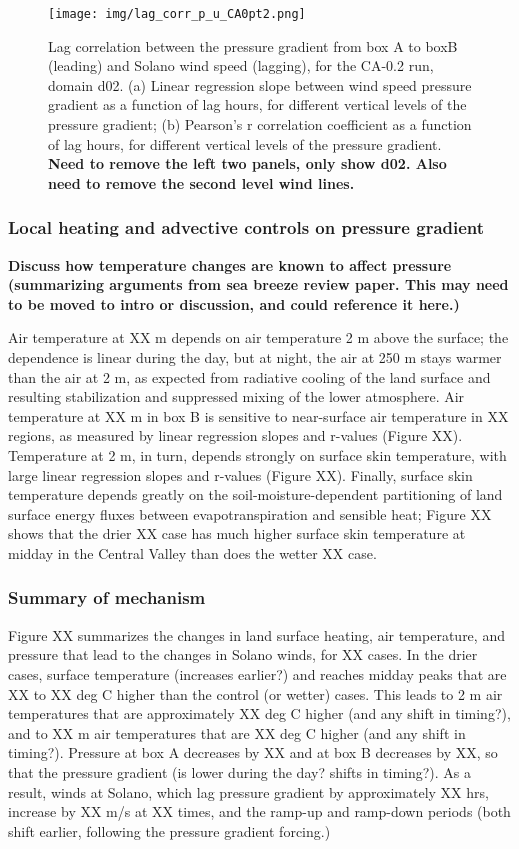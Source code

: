 \begin{figure}[here]
\texttt{[image: img/lag\_corr\_p\_u\_CA0pt2.png]}
\caption{Lag correlation between the pressure gradient from box A to boxB (leading) and Solano wind speed (lagging), for the CA-0.2 run, domain d02.  (a) Linear regression slope between wind speed pressure gradient as a function of lag hours, for different vertical levels of the pressure gradient; (b) Pearson's r correlation coefficient as a function of lag hours, for different vertical levels of the pressure gradient.  \textbf{Need to remove the left two panels, only show d02.  Also need to remove the second level wind lines.}}
\label{fig:windSol_lagcorrPgradU}
\end{figure}

\subsubsection{Local heating and advective controls on pressure gradient}

\textbf{Discuss how temperature changes are known to affect pressure (summarizing arguments from sea breeze review paper.  This may need to be moved to intro or discussion, and could reference it here.)}

Air temperature at XX m depends on air temperature 2 m above the surface; the dependence is linear during the day, but at night, the air at 250 m stays warmer than the air at 2 m, as expected from radiative cooling of the land surface and resulting stabilization and suppressed mixing of the lower atmosphere.  Air temperature at XX m in box B is sensitive to near-surface air temperature in XX regions, as measured by linear regression slopes and r-values (Figure XX).  Temperature at 2 m, in turn, depends strongly on surface skin temperature, with large linear regression slopes and r-values (Figure XX).  Finally, surface skin temperature depends greatly on the soil-moisture-dependent partitioning of land surface energy fluxes between evapotranspiration and sensible heat; Figure XX shows that the drier XX case has much higher surface skin temperature at midday in the Central Valley than does the wetter XX case.

\subsubsection{Summary of mechanism}

Figure XX summarizes the changes in land surface heating, air temperature, and pressure that lead to the changes in Solano winds, for XX cases.  In the drier cases, surface temperature (increases earlier?) and reaches midday peaks that are XX to XX deg C higher than the control (or wetter) cases.  This leads to 2 m air temperatures that are approximately XX deg C higher (and any shift in timing?), and to XX m air temperatures that are XX deg C higher (and any shift in timing?).  Pressure at box A decreases by XX and at box B decreases by XX, so that the pressure gradient (is lower during the day?  shifts in timing?).  As a result, winds at Solano, which lag pressure gradient by approximately XX hrs, increase by XX m/s at XX times, and the ramp-up and ramp-down periods (both shift earlier, following the pressure gradient forcing.)

